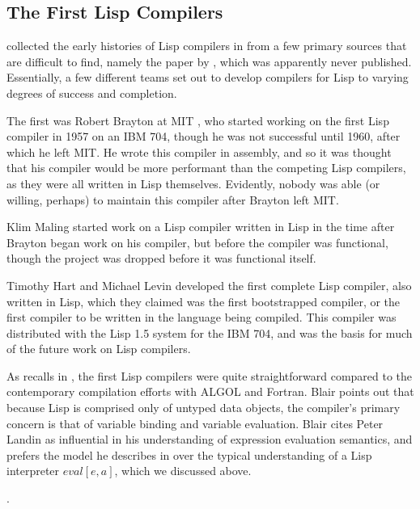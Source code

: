\subsection{The First Lisp Compilers}

\citeauthor{allen_anatomy_of_lisp_1978} collected the early histories of Lisp compilers
in \cite{allen_anatomy_of_lisp_1978}
from a few primary sources that are difficult to find, namely
the paper  by \citeauthor{blair_structure_lisp_compiler_1971},
which was apparently never published.
Essentially, a few different teams set out to develop compilers for Lisp
to varying degrees of success and completion.

The first was Robert Brayton at MIT \cite{blair_structure_lisp_compiler_1971},
who started working on the first Lisp compiler in 1957 on an IBM 704,
though he was not successful until 1960, after which he left MIT.
He wrote this compiler in assembly, and so it was thought that his compiler
would be more performant than the competing Lisp compilers, as they were
all written in Lisp themselves.
Evidently, nobody was able (or willing, perhaps) to maintain this compiler
after Brayton left MIT.

Klim Maling started work on a Lisp compiler written in Lisp
in the time after Brayton began work on his compiler, but before the compiler
was functional, though the project was dropped before it was functional itself.

Timothy Hart and Michael Levin developed the first complete Lisp compiler,
also written in Lisp, which
they claimed was the first \gls{bootstrapp}ed compiler,
or the first compiler to be written in the language being compiled.
This compiler was distributed with the Lisp 1.5 system for the IBM 704,
and was the basis for much of the future work on Lisp compilers.

As \citeauthor{blair_structure_lisp_compiler_1971} recalls in ,
the first Lisp compilers were quite straightforward compared to the contemporary compilation efforts
with ALGOL and Fortran.
Blair points out that because Lisp is comprised only of untyped data objects,
the compiler's primary concern is that of variable binding and variable evaluation.
Blair cites Peter Landin as influential in his understanding of expression
evaluation semantics, and prefers the model he describes in 
over the typical understanding of a Lisp interpreter $eval[e, a]$, which we discussed above.



.
